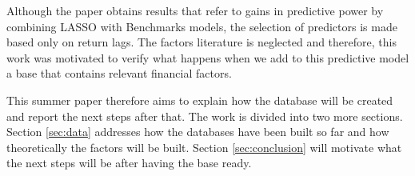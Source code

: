 Although the paper obtains results that refer to gains in predictive power by combining LASSO with Benchmarks models, the selection of predictors is made based only on return lags. The factors literature is neglected and therefore, this work was motivated to verify what happens when we add to this predictive model a base that contains relevant financial factors.

This summer paper therefore aims to explain how the database will be created and report the next steps after that. The work is divided into two more sections. Section \ref{sec:data} addresses how the databases have been built so far and how theoretically the factors will be built. Section \ref{sec:conclusion} will motivate what the next steps will be after having the base ready.





